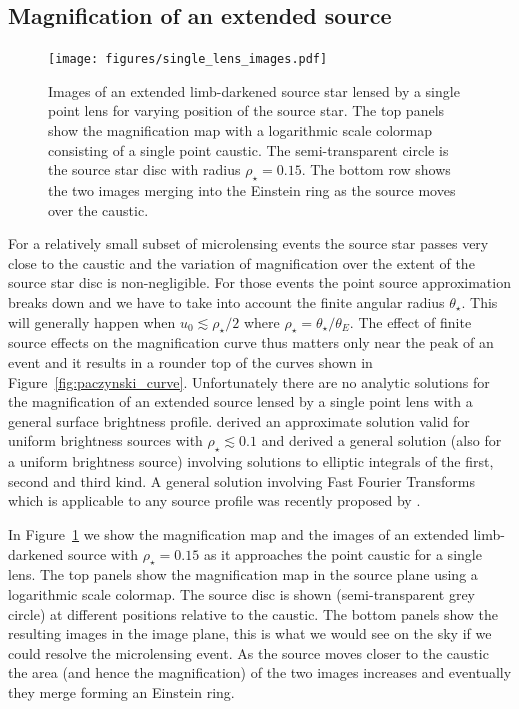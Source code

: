 \documentclass[12pt,dvipsnames]{report}
\begin{document}
\subsection{Magnification of an extended source}
\begin{figure}[t]
    \begin{centering}
        \texttt{[image: figures/single\_lens\_images.pdf]}
        \caption{Images of an extended limb-darkened source star lensed by a single
            point lens for varying position of the source star. The top panels show the magnification map with a logarithmic scale
            colormap  consisting of a single point caustic. The semi-transparent circle
            is the source star disc with radius $\rho_\star=0.15$. The bottom row shows
            the two images merging into the Einstein ring as the source moves over the caustic.}
        \label{fig:single_lens_images}
    \end{centering}
\end{figure}
For a relatively small subset of microlensing events the source star passes
very close to the caustic and the variation of magnification over the extent of
the source star disc is non-negligible. For those events the point source
approximation breaks down and we have to take into account the finite angular
radius $\theta_\star$. This will generally happen when $u_0 \lesssim
    \rho_\star/2$ \citep{1997ApJ...477..580G} where
$\rho_\star=\theta_\star/\theta_E$. The effect of finite source effects on the
magnification curve thus matters only near the peak of an event and it results
in a rounder top of the curves shown in Figure~\ref{fig:paczynski_curve}.
Unfortunately there are no analytic solutions for the magnification of an
extended source lensed by a single point lens with a general surface brightness
profile. \citet{1994ApJ...421L..71G} derived an approximate solution valid for
uniform brightness sources with $\rho_\star\lesssim 0.1$ and
\citet{1994ApJ...430..505W} derived a general solution (also for a uniform
brightness source) involving solutions to elliptic integrals of the first,
second and third kind. A general solution involving Fast Fourier Transforms
which is applicable to any source profile was recently proposed by
\citet{2022arXiv220306637S}.

In Figure~\ref{fig:single_lens_images} we show the magnification map and the
images of an extended limb-darkened source with $\rho_\star=0.15$ as it
approaches the point caustic for a single lens. The top panels show the
magnification map in the source plane using a logarithmic scale colormap. The
source disc is shown (semi-transparent grey circle) at different positions
relative to the caustic. The bottom panels show the resulting images in the
image plane, this is what we would see on the sky if we could resolve the
microlensing event. As the source moves closer to the caustic the area (and
hence the magnification) of the two images increases and eventually they merge
forming an Einstein ring.
\end{document}
